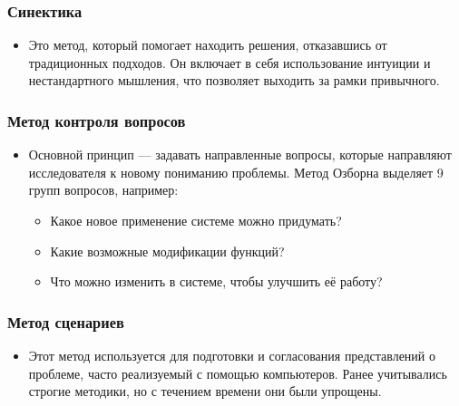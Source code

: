 \documentclass[
]{article}
\providecommand{\tightlist}{%
  \setlength{\itemsep}{0pt}\setlength{\parskip}{0pt}}
\begin{document}
\subsubsection{\texorpdfstring{\textbf{Синектика}}{Синектика}}\label{ux441ux438ux43dux435ux43aux442ux438ux43aux430}

\begin{itemize}
\tightlist
\item
  Это метод, который помогает находить решения, отказавшись от
  традиционных подходов. Он включает в себя использование интуиции и
  нестандартного мышления, что позволяет выходить за рамки привычного.
\end{itemize}

\subsubsection{\texorpdfstring{\textbf{Метод контроля
вопросов}}{Метод контроля вопросов}}\label{ux43cux435ux442ux43eux434-ux43aux43eux43dux442ux440ux43eux43bux44f-ux432ux43eux43fux440ux43eux441ux43eux432}

\begin{itemize}
\tightlist
\item
  Основной принцип --- задавать направленные вопросы, которые направляют
  исследователя к новому пониманию проблемы. Метод Озборна выделяет 9
  групп вопросов, например:

  \begin{itemize}
  \tightlist
  \item
    Какое новое применение системе можно придумать?
  \item
    Какие возможные модификации функций?
  \item
    Что можно изменить в системе, чтобы улучшить её работу?
  \end{itemize}
\end{itemize}

\subsubsection{\texorpdfstring{\textbf{Метод
сценариев}}{Метод сценариев}}\label{ux43cux435ux442ux43eux434-ux441ux446ux435ux43dux430ux440ux438ux435ux432}

\begin{itemize}
\tightlist
\item
  Этот метод используется для подготовки и согласования представлений о
  проблеме, часто реализуемый с помощью компьютеров. Ранее учитывались
  строгие методики, но с течением времени они были упрощены.
\end{itemize}
\end{document}
